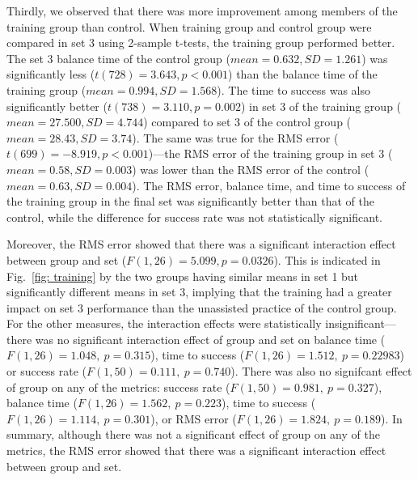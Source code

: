 Thirdly, we observed that there was more improvement among members of the training group than control. When training group and control group were compared in set 3 using 2-sample t-tests, the training group performed better. The set 3 balance time of the control group ($mean =0.632, SD = 1.261$) was significantly less ($t(728)=3.643,p<0.001$) than the balance time of the training group ($mean = 0.994 , SD = 1.568$). The time to success was also significantly better ($t(738)=3.110, p=0.002$) in set 3 of the training group ($mean = 27.500, SD = 4.744$) compared to set 3 of the control group ($mean =28.43, SD = 3.74$). The same was true for the RMS error ($t(699)=-8.919,p<0.001$)---the RMS error of the training group in set 3 ($mean = 0.58, SD = 0.003$) was lower than the RMS error of the control ($mean = 0.63, SD = 0.004$). The RMS error, balance time, and time to success of the training group in the final set was significantly better than that of the control, while the difference for success rate was not statistically significant. 

Moreover, the RMS error showed that there was a significant interaction effect between group and set ($F(1,26)=5.099, p=0.0326$). This is indicated in Fig.~\ref{fig: training} by the two groups having similar means in set 1 but significantly different means in set 3, implying that the training had a greater impact on set 3 performance than the unassisted practice of the control group. For the other measures, the interaction effects were statistically insignificant---there was no significant interaction effect of group and set on balance time ($F(1,26)=1.048,\ p=0.315$), time to success ($F(1,26)=1.512,\ p=0.22983$) or success rate ($F(1,50)=0.111,\ p=0.740$). There was also no signifcant effect of group on any of the metrics: success rate ($F(1,50)=0.981,\ p=0.327$), balance time ($F(1,26)=1.562,\ p=0.223$), time to success ($F(1,26) = 1.114,\ p=0.301$), or RMS error ($F(1,26) = 1.824 ,\ p=0.189$). In summary, although there was not a significant effect of group on any of the  metrics, the RMS  error  showed  that there  was  a  significant  interaction  effect between  group  and set.  


